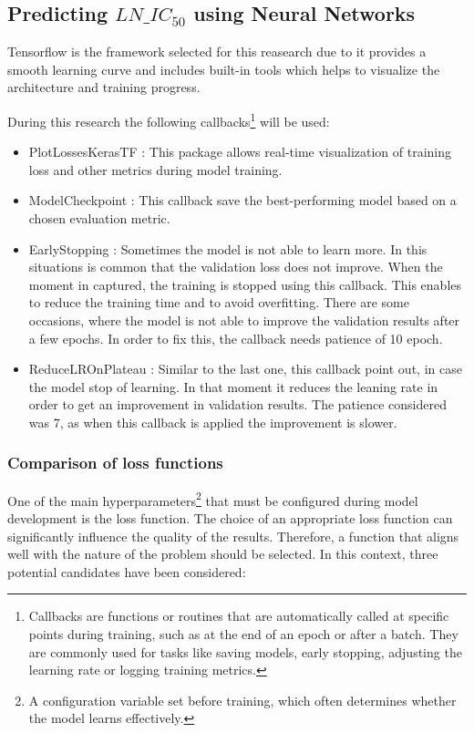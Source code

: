 \subsection{Predicting $LN\_IC_{50}$ using Neural Networks}

Tensorflow is the framework selected for this reasearch due to it provides a smooth learning curve and includes built-in tools which helps to visualize the architecture and training progress.

During this research the following callbacks\footnote{Callbacks are functions or routines that are automatically called at specific points during training, such as at the end of an epoch or after a batch. They are commonly used for tasks like saving models, early stopping, adjusting the learning rate or logging training metrics.} will be used:
\begin{itemize}
    \item PlotLossesKerasTF \cite{livelossplot}: This package allows real-time visualization of training loss and other metrics during model training.
    \item ModelCheckpoint \cite{modelcheckpoint}: This callback save the best-performing model based on a chosen evaluation metric.
    \item EarlyStopping \cite{earlystopping}: Sometimes the model is not able to learn more. In this situations is common that the validation loss does not improve. When the moment in captured, the training is stopped using this callback. This enables to reduce the training time and to avoid overfitting. There are some occasions, where the model is not able to improve the validation results after a few epochs. In order to fix this, the callback needs patience of 10 epoch.
    \item ReduceLROnPlateau \cite{reducelronplateau}: Similar to the last one, this callback point out, in case the model stop of learning. In that moment it reduces the leaning rate in order to get an improvement in validation results. The patience considered was 7, as when this callback is applied the improvement is slower.
\end{itemize}



\subsubsection{Comparison of loss functions}

One of the main hyperparameters\footnote{A configuration variable set before training, which often determines whether the model learns effectively.} that must be configured during model development is the loss function. The choice of an appropriate loss function can significantly influence the quality of the results. Therefore, a function that aligns well with the nature of the problem should be selected. In this context, three potential candidates have been considered:

